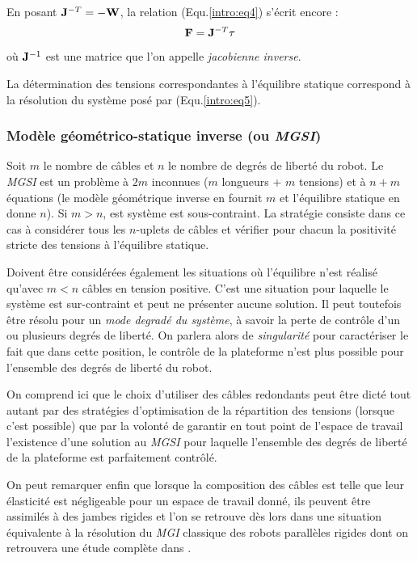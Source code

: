 En posant ${\bf J}^{-T} = - {\bf W}$, la relation (Equ.\ref{intro:eq4}) s'écrit encore :
\begin{equation}
\mathcal {\bf F} = {\bf J}^{-T} {\bf \tau}
\label{intro:eq5}
\end{equation}
où ${\bf J}^{-1}$ est une matrice que l'on appelle {\it jacobienne inverse}.

La détermination des tensions correspondantes à l'équilibre statique correspond à la résolution du système posé par (Equ.\ref{intro:eq5}).

\subsubsection{Modèle géométrico-statique inverse (ou {\it MGSI})}

Soit $m$ le nombre de câbles et $n$ le nombre de degrés de liberté du robot. Le {\it MGSI} est un problème à $2m$ inconnues ($m$ longueurs + $m$ tensions) et à $n+m$ équations (le modèle géométrique inverse en fournit $m$ et l'équilibre statique en donne $n$). Si $m > n$, est système est sous-contraint. La stratégie consiste dans ce cas à considérer tous les $n$-uplets de câbles et vérifier pour chacun la positivité stricte des tensions à l'équilibre statique.

Doivent être considérées également les situations où l'équilibre n'est réalisé qu'avec $m < n$ câbles en tension positive. C'est une situation pour laquelle le système est sur-contraint et peut ne présenter aucune solution. Il peut toutefois être résolu pour un {\it mode degradé du système}, à savoir la perte de contrôle d'un ou plusieurs degrés de liberté. On parlera alors de {\it singularité} pour caractériser le fait que dans cette position, le contrôle de la plateforme n'est plus possible pour l'ensemble des degrés de liberté du robot.

On comprend ici que le choix d'utiliser des câbles redondants peut être dicté tout autant par des stratégies d'optimisation de la répartition des tensions (lorsque c'est possible) que par la volonté de garantir en tout point de l'espace de travail l'existence d'une solution au {\it MGSI} pour laquelle l'ensemble des degrés de liberté de la plateforme est parfaitement contrôlé.

On peut remarquer enfin que lorsque la composition des câbles est telle que leur élasticité est négligeable pour un espace de travail donné, ils peuvent être assimilés à des jambes rigides et l'on se retrouve dès lors dans une situation équivalente à la résolution du {\it MGI} classique des robots parallèles rigides dont on retrouvera une étude complète dans \cite{merlet1997robots}.

